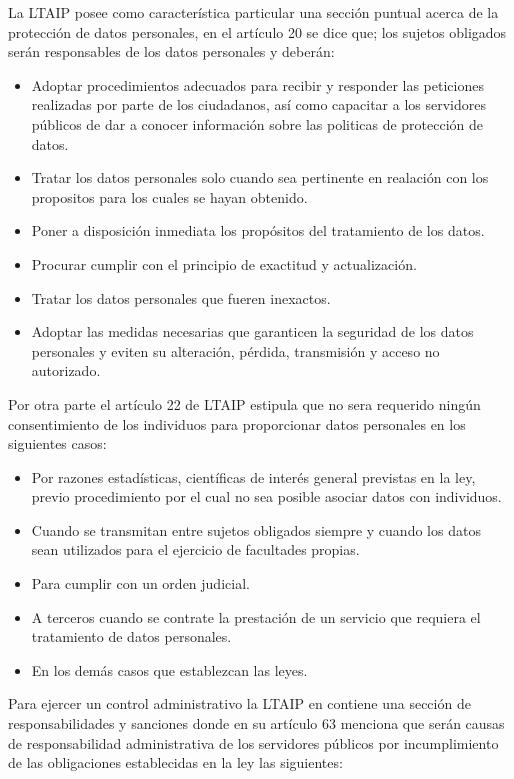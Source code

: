 \documentclass[runningheads,a4paper]{llncs}
\begin{document}
La \gls{LTAIP} posee como característica particular una sección puntual acerca de la protección de datos personales, en el artículo 20 se dice que; los sujetos obligados serán responsables de los datos personales y deberán:

\begin{itemize}
	\item Adoptar procedimientos adecuados para recibir y responder las peticiones realizadas por parte de los ciudadanos, así como capacitar a los servidores públicos de dar a conocer información sobre las politicas de protección de datos.
	\item Tratar los datos personales solo cuando sea pertinente en realación con los propositos para los cuales se hayan obtenido.
	\item Poner a disposición inmediata los propósitos del tratamiento de los datos.
	\item Procurar cumplir con el principio de exactitud y actualización.
	\item Tratar los datos personales que fueren inexactos.
	\item Adoptar las medidas necesarias que garanticen la seguridad de los datos personales y eviten su
alteración, pérdida, transmisión y acceso no autorizado. 
\end{itemize}

Por otra parte el artículo 22 de \gls{LTAIP} estipula que no sera requerido ningún consentimiento de los individuos para proporcionar datos personales en los siguientes casos:

\begin{itemize}
	\item Por razones estadísticas, científicas de interés general previstas en la ley, previo procedimiento por el cual no sea posible asociar datos con individuos.
	\item Cuando se transmitan entre sujetos obligados siempre y cuando los datos sean utilizados para el ejercicio de facultades propias.
	\item Para cumplir con un orden judicial.
	\item A terceros cuando se contrate la prestación de un servicio que requiera el tratamiento de datos personales.
	\item En los demás casos que establezcan las leyes.
\end{itemize}

Para ejercer un control administrativo la \gls{LTAIP} en contiene una sección de responsabilidades y sanciones donde en su artículo 63 menciona que serán causas de responsabilidad administrativa de los servidores públicos por incumplimiento de las obligaciones establecidas en la ley las siguientes:
\end{document}
